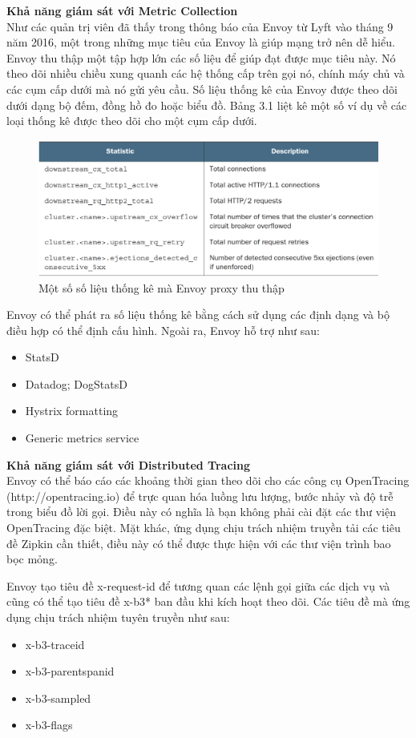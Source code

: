 \documentclass[14pt,a4paper]{book}
\begin{document}
		\textbf{Khả năng giám sát với Metric Collection}\\
		Như các quản trị viên đã thấy trong thông báo của Envoy từ Lyft vào tháng 9 năm 2016, một trong những mục tiêu của Envoy là giúp mạng trở nên dễ hiểu. Envoy thu thập một tập hợp lớn các số liệu để giúp đạt được mục tiêu này. Nó theo dõi nhiều chiều xung quanh các hệ thống cấp trên gọi nó, chính máy chủ và các cụm cấp dưới mà nó gửi yêu cầu. Số liệu thống kê của Envoy được theo dõi dưới dạng bộ đếm, đồng hồ đo hoặc biểu đồ. Bảng 3.1 liệt kê một số ví dụ về các loại thống kê được theo dõi cho một cụm cấp dưới.
		\begin{figure}[h]
			\centering
			\includegraphics[width=0.7\linewidth]{Pics/2.1.3-p4}
			\caption{Một số số liệu thống kê mà Envoy proxy thu thập}
			\label{fig:2.3.1-4}
		\end{figure}
		
		Envoy có thể phát ra số liệu thống kê bằng cách sử dụng các định dạng và bộ điều hợp có thể định cấu hình. Ngoài ra, Envoy hỗ trợ như sau:
		\begin{itemize}
			\item StatsD
			\item Datadog; DogStatsD
			\item Hystrix formatting
			\item Generic metrics service
		\end{itemize}
		
		\textbf{Khả năng giám sát với Distributed Tracing}\\
		Envoy có thể báo cáo các khoảng thời gian theo dõi cho các công cụ OpenTracing (http://opentracing.io) để trực quan hóa luồng lưu lượng, bước nhảy và độ trễ trong biểu đồ lời gọi. Điều này có nghĩa là bạn không phải cài đặt các thư viện OpenTracing đặc biệt. Mặt khác, ứng dụng chịu trách nhiệm truyền tải các tiêu đề Zipkin cần thiết, điều này có thể được thực hiện với các thư viện trình bao bọc mỏng.
		
		Envoy tạo tiêu đề x-request-id để tương quan các lệnh gọi giữa các dịch vụ và cũng có thể tạo tiêu đề x-b3* ban đầu khi kích hoạt theo dõi. Các tiêu đề mà ứng dụng chịu trách nhiệm tuyên truyền như sau:
		\begin{itemize}
			\item x-b3-traceid
			\item x-b3-parentspanid
			\item x-b3-sampled
			\item x-b3-flags
		\end{itemize}
		
\end{document}
